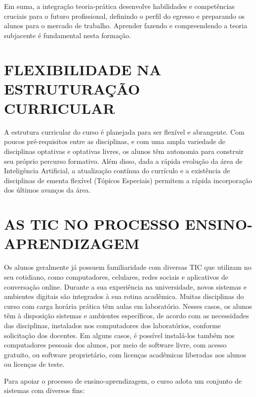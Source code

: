 Em suma, a integração teoria-prática desenvolve habilidades e competências cruciais para o futuro profissional, definindo o perfil do egresso e preparando os alunos para o mercado de trabalho. Aprender fazendo e compreendendo a teoria subjacente é fundamental nesta formação.

\section{FLEXIBILIDADE NA ESTRUTURAÇÃO CURRICULAR}

A estrutura curricular do curso é planejada para ser flexível e abrangente. Com poucos pré-requisitos entre as disciplinas, e com uma ampla variedade de disciplinas optativas e optativas livres, os alunos têm autonomia para construir seu próprio percurso formativo.
%
Além disso, dada a rápida evolução da área de Inteligência Artificial, a atualização contínua do currículo e a existência de disciplinas de ementa flexível (Tópicos Especiais) permitem a rápida incorporação dos últimos avanços da área.

\section{AS TIC NO PROCESSO ENSINO-APRENDIZAGEM} \label{sec:TICEA}

Os alunos geralmente já possuem familiaridade com diversas TIC que utilizam no seu cotidiano, como computadores, celulares, redes sociais e aplicativos de conversação online. Durante a sua experiência na universidade, novos sistemas e ambientes digitais são integrados à sua rotina acadêmica.
%
Muitas disciplinas do curso com carga horária prática têm aulas em laboratório. Nesses casos, os alunos têm à disposição sistemas e ambientes específicos, de acordo com as necessidades das disciplinas, instalados nos computadores dos laboratórios, conforme solicitação dos docentes. Em alguns casos, é possível instalá-los também nos computadores pessoais dos alunos, por meio de software livre, com acesso gratuito, ou software proprietário, com licenças acadêmicas liberadas aos alunos ou licenças de teste.

Para apoiar o processo de ensino-aprendizagem, o curso adota um conjunto de sistemas com diversos fins:

